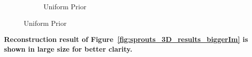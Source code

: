 \documentclass{article}
\begin{document}
\begin{figure}[!h]
    \begin{subfigure}[b]{\linewidth}
\captionsetup{labelformat=empty}
        \caption{\large{Uniform Prior}}
     \end{subfigure}
\end{figure}
\newpage
\textbf{Reconstruction result of Figure~\ref{fig:sprouts_3D_results_biggerIm}  is shown in large size for better clarity.}\\
\end{document}
